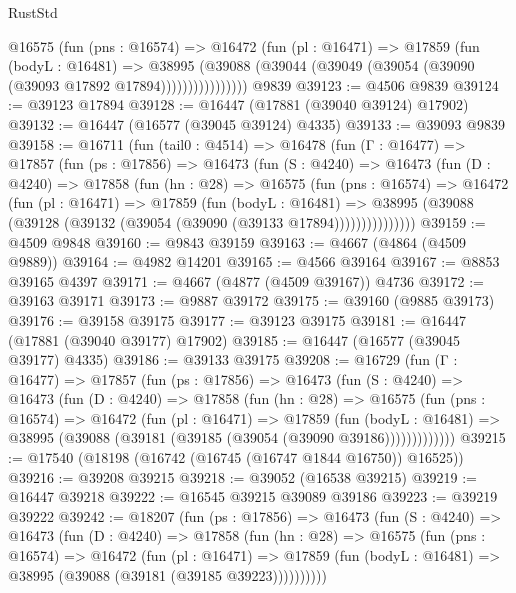 \begin{lexlean}{RustStd}
\begin{coremodule}
{\begin{coremodule}
{{{{{{{{{{{{{{{{{{{{{{{{{{{{{{{{{{{{{{{{{{{{{{{{{{{{{{{                @16575
                  (fun (pns : @16574) =>
                  @16472
                    (fun (pl : @16471) =>
                    @17859
                      (fun (bodyL : @16481) =>
                      @38995
                        (@39088
                          (@39044 (@39049 (@39054 (@39090 (@39093 @17892 @17894))))))))))))))))
    @9839
@39123 := @4506 @9839
@39124 := @39123 @17894
@39128 := @16447 (@17881 (@39040 @39124) @17902)
@39132 := @16447 (@16577 (@39045 @39124) @4335)
@39133 := @39093 @9839
@39158 := @16711
    (fun (tail0 : @4514) =>
    @16478
      (fun (Γ : @16477) =>
      @17857
        (fun (ps : @17856) =>
        @16473
          (fun (S : @4240) =>
          @16473
            (fun (D : @4240) =>
            @17858
              (fun (hn : @28) =>
              @16575
                (fun (pns : @16574) =>
                @16472
                  (fun (pl : @16471) =>
                  @17859
                    (fun (bodyL : @16481) =>
                    @38995 (@39088 (@39128 (@39132 (@39054 (@39090 (@39133 @17894)))))))))))))))
@39159 := @4509 @9848
@39160 := @9843 @39159
@39163 := @4667 (@4864 (@4509 @9889))
@39164 := @4982 @14201
@39165 := @4566 @39164
@39167 := @8853 @39165 @4397
@39171 := @4667 (@4877 (@4509 @39167)) @4736
@39172 := @39163 @39171
@39173 := @9887 @39172
@39175 := @39160 (@9885 @39173)
@39176 := @39158 @39175
@39177 := @39123 @39175
@39181 := @16447 (@17881 (@39040 @39177) @17902)
@39185 := @16447 (@16577 (@39045 @39177) @4335)
@39186 := @39133 @39175
@39208 := @16729
    (fun (Γ : @16477) =>
    @17857
      (fun (ps : @17856) =>
      @16473
        (fun (S : @4240) =>
        @16473
          (fun (D : @4240) =>
          @17858
            (fun (hn : @28) =>
            @16575
              (fun (pns : @16574) =>
              @16472
                (fun (pl : @16471) =>
                @17859
                  (fun (bodyL : @16481) =>
                  @38995 (@39088 (@39181 (@39185 (@39054 (@39090 @39186)))))))))))))
@39215 := @17540 (@18198 (@16742 (@16745 (@16747 @1844 @16750)) @16525))
@39216 := @39208 @39215
@39218 := @39052 (@16538 @39215)
@39219 := @16447 @39218
@39222 := @16545 @39215 @39089 @39186
@39223 := @39219 @39222
@39242 := @18207
    (fun (ps : @17856) =>
    @16473
      (fun (S : @4240) =>
      @16473
        (fun (D : @4240) =>
        @17858
          (fun (hn : @28) =>
          @16575
            (fun (pns : @16574) =>
            @16472
              (fun (pl : @16471) =>
              @17859 (fun (bodyL : @16481) => @38995 (@39088 (@39181 (@39185 @39223))))))))))
}}}}}}}}}}}}}}}}}}}}}}}}}}}}}}}}}}}}}}}}}}}}}}}}}}}}}}}
\end{coremodule}}
\end{coremodule}
\end{lexlean}
